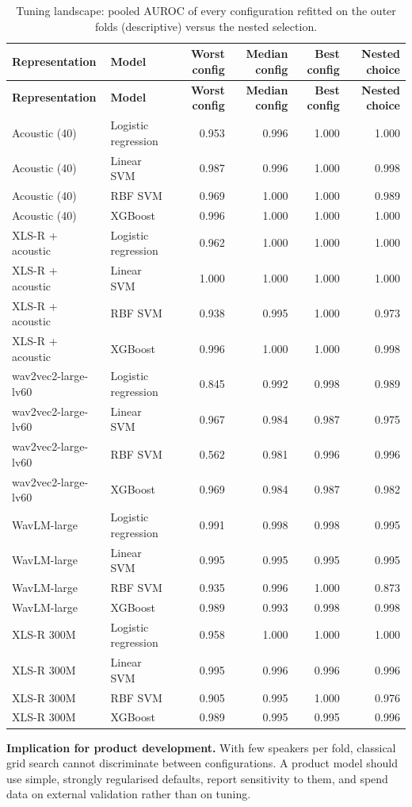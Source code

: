 \documentclass[10pt,a4paper]{article}
\begin{document}
\begin{center}\tiny\renewcommand{\arraystretch}{1.12}
\begin{longtable}{llrrrr}
\caption{Tuning landscape: pooled AUROC of every configuration refitted on the outer folds (descriptive) versus the nested selection.}\\
\toprule
\textbf{Representation} & \textbf{Model} & \textbf{Worst config} & \textbf{Median config} & \textbf{Best config} & \textbf{Nested choice}\\\midrule\endfirsthead
\toprule
\textbf{Representation} & \textbf{Model} & \textbf{Worst config} & \textbf{Median config} & \textbf{Best config} & \textbf{Nested choice}\\\midrule\endhead
\bottomrule\endfoot
Acoustic (40) & Logistic regression & 0.953 & 0.996 & 1.000 & 1.000\\
Acoustic (40) & Linear SVM & 0.987 & 0.996 & 1.000 & 0.998\\
Acoustic (40) & RBF SVM & 0.969 & 1.000 & 1.000 & 0.989\\
Acoustic (40) & XGBoost & 0.996 & 1.000 & 1.000 & 1.000\\
XLS-R + acoustic & Logistic regression & 0.962 & 1.000 & 1.000 & 1.000\\
XLS-R + acoustic & Linear SVM & 1.000 & 1.000 & 1.000 & 1.000\\
XLS-R + acoustic & RBF SVM & 0.938 & 0.995 & 1.000 & 0.973\\
XLS-R + acoustic & XGBoost & 0.996 & 1.000 & 1.000 & 0.998\\
wav2vec2-large-lv60 & Logistic regression & 0.845 & 0.992 & 0.998 & 0.989\\
wav2vec2-large-lv60 & Linear SVM & 0.967 & 0.984 & 0.987 & 0.975\\
wav2vec2-large-lv60 & RBF SVM & 0.562 & 0.981 & 0.996 & 0.996\\
wav2vec2-large-lv60 & XGBoost & 0.969 & 0.984 & 0.987 & 0.982\\
WavLM-large & Logistic regression & 0.991 & 0.998 & 0.998 & 0.995\\
WavLM-large & Linear SVM & 0.995 & 0.995 & 0.995 & 0.995\\
WavLM-large & RBF SVM & 0.935 & 0.996 & 1.000 & 0.873\\
WavLM-large & XGBoost & 0.989 & 0.993 & 0.998 & 0.998\\
XLS-R 300M & Logistic regression & 0.958 & 1.000 & 1.000 & 1.000\\
XLS-R 300M & Linear SVM & 0.995 & 0.996 & 0.996 & 0.996\\
XLS-R 300M & RBF SVM & 0.905 & 0.995 & 1.000 & 0.976\\
XLS-R 300M & XGBoost & 0.989 & 0.995 & 0.995 & 0.996\\
\end{longtable}\end{center}
\textbf{Implication for product development.} With few speakers per fold, classical grid search cannot discriminate between configurations. A product model should use simple, strongly regularised defaults, report sensitivity to them, and spend data on external validation rather than on tuning.
\end{document}
